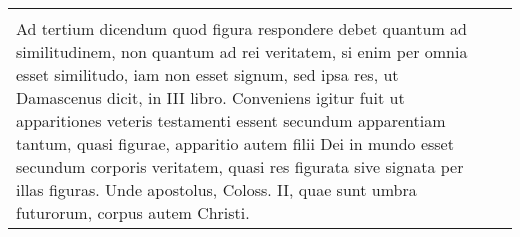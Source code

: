 \documentclass[10pt]{jsarticle} %
\begin{document}
\begin{longtable}{p{21em}p{21em}}
&


\\



Ad tertium dicendum quod figura respondere debet quantum ad
similitudinem, non quantum ad rei veritatem, si enim per omnia esset
similitudo, iam non esset signum, sed ipsa res, ut Damascenus dicit, in
III libro. Conveniens igitur fuit ut apparitiones veteris testamenti
essent secundum apparentiam tantum, quasi figurae, apparitio autem filii
Dei in mundo esset secundum corporis veritatem, quasi res figurata sive
signata per illas figuras. Unde apostolus, Coloss. II, quae sunt umbra
futurorum, corpus autem Christi.


&





\end{longtable}
\newpage
\end{document}
